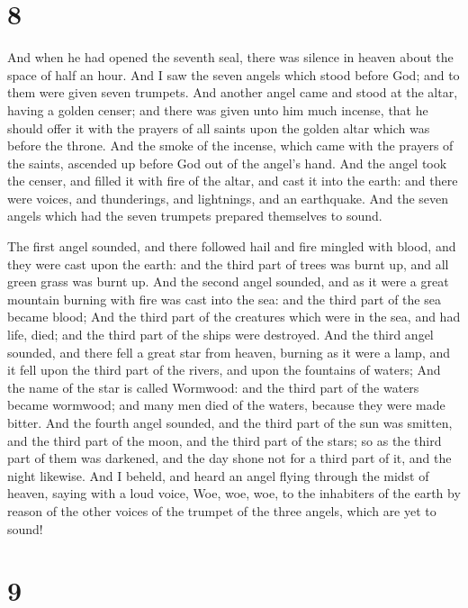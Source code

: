 \hypertarget{section-7}{%
\section{8}\label{section-7}}

 And when he had opened the seventh seal, there was silence
in heaven about the space of half an hour.  And I saw the
seven angels which stood before God; and to them were given seven
trumpets.  And another angel came and stood at the altar,
having a golden censer; and there was given unto him much incense, that
he should offer it with the prayers of all saints upon the golden altar
which was before the throne.  And the smoke of the incense,
which came with the prayers of the saints, ascended up before God out of
the angel's hand.  And the angel took the censer, and filled
it with fire of the altar, and cast it into the earth: and there were
voices, and thunderings, and lightnings, and an earthquake. 
And the seven angels which had the seven trumpets prepared themselves to
sound.

 The first angel sounded, and there followed hail and fire
mingled with blood, and they were cast upon the earth: and the third
part of trees was burnt up, and all green grass was burnt up.
 And the second angel sounded, and as it were a great
mountain burning with fire was cast into the sea: and the third part of
the sea became blood;  And the third part of the creatures
which were in the sea, and had life, died; and the third part of the
ships were destroyed.  And the third angel sounded, and
there fell a great star from heaven, burning as it were a lamp, and it
fell upon the third part of the rivers, and upon the fountains of
waters;  And the name of the star is called Wormwood: and
the third part of the waters became wormwood; and many men died of the
waters, because they were made bitter.  And the fourth
angel sounded, and the third part of the sun was smitten, and the third
part of the moon, and the third part of the stars; so as the third part
of them was darkened, and the day shone not for a third part of it, and
the night likewise.  And I beheld, and heard an angel
flying through the midst of heaven, saying with a loud voice, Woe, woe,
woe, to the inhabiters of the earth by reason of the other voices of the
trumpet of the three angels, which are yet to sound!

\hypertarget{section-8}{%
\section{9}\label{section-8}}


